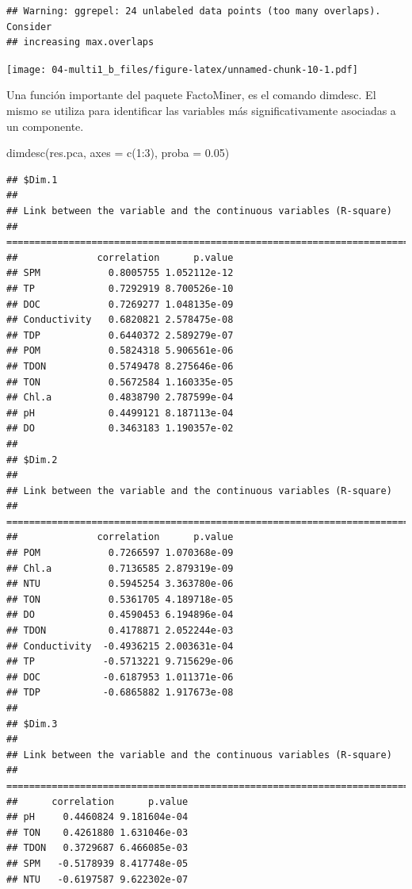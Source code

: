 \documentclass[
]{book}
\newenvironment{Shaded}{\begin{snugshade}}{\end{snugshade}}
\newcommand{\AttributeTok}[1]{\textcolor[rgb]{0.77,0.63,0.00}{#1}}
\newcommand{\DecValTok}[1]{\textcolor[rgb]{0.00,0.00,0.81}{#1}}
\newcommand{\FloatTok}[1]{\textcolor[rgb]{0.00,0.00,0.81}{#1}}
\newcommand{\FunctionTok}[1]{\textcolor[rgb]{0.00,0.00,0.00}{#1}}
\newcommand{\NormalTok}[1]{#1}
\newcommand{\SpecialCharTok}[1]{\textcolor[rgb]{0.00,0.00,0.00}{#1}}
\begin{document}
\begin{verbatim}
## Warning: ggrepel: 24 unlabeled data points (too many overlaps). Consider
## increasing max.overlaps
\end{verbatim}

\texttt{[image: 04-multi1\_b\_files/figure-latex/unnamed-chunk-10-1.pdf]}

Una función importante del paquete FactoMiner, es el comando dimdesc. El mismo se utiliza para identificar las variables más significativamente asociadas a un componente.

\begin{Shaded}
\begin{Highlighting}[]
\FunctionTok{dimdesc}\NormalTok{(res.pca, }\AttributeTok{axes =} \FunctionTok{c}\NormalTok{(}\DecValTok{1}\SpecialCharTok{:}\DecValTok{3}\NormalTok{), }\AttributeTok{proba =} \FloatTok{0.05}\NormalTok{)}
\end{Highlighting}
\end{Shaded}

\begin{verbatim}
## $Dim.1
## 
## Link between the variable and the continuous variables (R-square)
## =================================================================================
##              correlation      p.value
## SPM            0.8005755 1.052112e-12
## TP             0.7292919 8.700526e-10
## DOC            0.7269277 1.048135e-09
## Conductivity   0.6820821 2.578475e-08
## TDP            0.6440372 2.589279e-07
## POM            0.5824318 5.906561e-06
## TDON           0.5749478 8.275646e-06
## TON            0.5672584 1.160335e-05
## Chl.a          0.4838790 2.787599e-04
## pH             0.4499121 8.187113e-04
## DO             0.3463183 1.190357e-02
## 
## $Dim.2
## 
## Link between the variable and the continuous variables (R-square)
## =================================================================================
##              correlation      p.value
## POM            0.7266597 1.070368e-09
## Chl.a          0.7136585 2.879319e-09
## NTU            0.5945254 3.363780e-06
## TON            0.5361705 4.189718e-05
## DO             0.4590453 6.194896e-04
## TDON           0.4178871 2.052244e-03
## Conductivity  -0.4936215 2.003631e-04
## TP            -0.5713221 9.715629e-06
## DOC           -0.6187953 1.011371e-06
## TDP           -0.6865882 1.917673e-08
## 
## $Dim.3
## 
## Link between the variable and the continuous variables (R-square)
## =================================================================================
##      correlation      p.value
## pH     0.4460824 9.181604e-04
## TON    0.4261880 1.631046e-03
## TDON   0.3729687 6.466085e-03
## SPM   -0.5178939 8.417748e-05
## NTU   -0.6197587 9.622302e-07
\end{verbatim}
\end{document}
